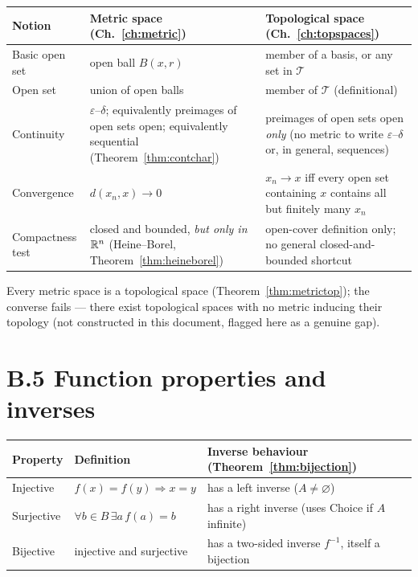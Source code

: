 \begin{center}
\begin{tabular}{@{}p{4.1cm}p{4.3cm}p{4.3cm}@{}}
	\toprule
	\textbf{Notion} & \textbf{Metric space (Ch.~\ref{ch:metric})} & \textbf{Topological space (Ch.~\ref{ch:topspaces})}\\
	\midrule
	Basic open set & open ball $B(x,r)$ & member of a basis, or any set in $\mathcal T$\\
	Open set & union of open balls & member of $\mathcal T$ (definitional)\\
	Continuity & $\varepsilon$--$\delta$; equivalently preimages of open sets open; equivalently sequential (Theorem~\ref{thm:contchar}) & preimages of open sets open \emph{only} (no metric to write $\varepsilon$--$\delta$ or, in general, sequences)\\
	Convergence & $d(x_n,x)\to0$ & $x_n\to x$ iff every open set containing $x$ contains all but finitely many $x_n$\\
	Compactness test & closed and bounded, \emph{but only in $\mathbb{R}^n$} (Heine--Borel, Theorem~\ref{thm:heineborel}) & open-cover definition only; no general closed-and-bounded shortcut\\
	\bottomrule
\end{tabular}
\end{center}

Every metric space is a topological space (Theorem~\ref{thm:metrictop}); the converse fails --- there exist topological spaces with no metric inducing their topology (not constructed in this document, flagged here as a genuine gap).

\section*{B.5 Function properties and inverses}

\begin{center}
\begin{tabular}{@{}lp{5.2cm}p{5.2cm}@{}}
	\toprule
	\textbf{Property} & \textbf{Definition} & \textbf{Inverse behaviour (Theorem~\ref{thm:bijection})}\\
	\midrule
	Injective & $f(x)=f(y)\Rightarrow x=y$ & has a left inverse ($A\ne\varnothing$)\\
	Surjective & $\forall b\in B\,\exists a\,f(a)=b$ & has a right inverse (uses Choice if $A$ infinite)\\
	Bijective & injective and surjective & has a two-sided inverse $f^{-1}$, itself a bijection\\
	\bottomrule
\end{tabular}
\end{center}

